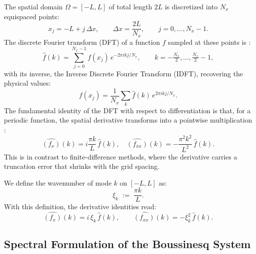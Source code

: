 The spatial domain $\Omega = [-L, L]$ of total length $2L$ is discretized into $N_x$ equispaced points:
\begin{equation*}
    x_j = -L + j\,\Delta x, \qquad \Delta x = \frac{2L}{N_x},
    \qquad j = 0, \ldots, N_x - 1.
\end{equation*}
The discrete Fourier transform (DFT) of a function $f$ sampled at these points is \parencite{trefethen2000}:
\begin{equation}\label{eq:dft}
    \hat{f}(k) = \sum_{j=0}^{N_x-1} f(x_j)\, e^{-2\pi i k j / N_x},
    \qquad k = -\tfrac{N_x}{2}, \ldots, \tfrac{N_x}{2} - 1,
\end{equation}
with its inverse, the Inverse Discrete Fourier Transform (IDFT), recovering the physical values:
\begin{equation}\label{eq:idft}
    f(x_j) = \frac{1}{N_x} \sum_{k} \hat{f}(k)\, e^{2\pi i k j / N_x}.
\end{equation}
The fundamental identity of the DFT with respect to differentiation is that, for a periodic function, the spatial derivative transforms into a pointwise multiplication \parencite{trefethen2000, steinmoeller2012}:
\begin{equation*}
    \widehat{(f_x)}(k) = i \frac{\pi k}{L}\, \hat{f}(k), \quad
    \widehat{(f_{xx})}(k) = -\frac{\pi^2 k^2}{L^2}\, \hat{f}(k).
\end{equation*}
This is in contrast to finite-difference methods, where the derivative carries a truncation error that shrinks with the grid spacing.

We define the wavenumber of mode $k$ on $[-L,L]$ as:
\begin{equation}\label{eq:xi_def}
    \xi_k \;:=\; \frac{\pi k}{L}.
\end{equation}
With this definition, the derivative identities read:
\begin{equation}\label{eq:dft_deriv}
    \widehat{(f_x)}(k) = i\,\xi_k\,\hat{f}(k), \qquad
    \widehat{(f_{xx})}(k) = -\xi_k^2\,\hat{f}(k).
\end{equation}

\subsection{Spectral Formulation of the Boussinesq System}
\label{subsec:spectral_bou}

